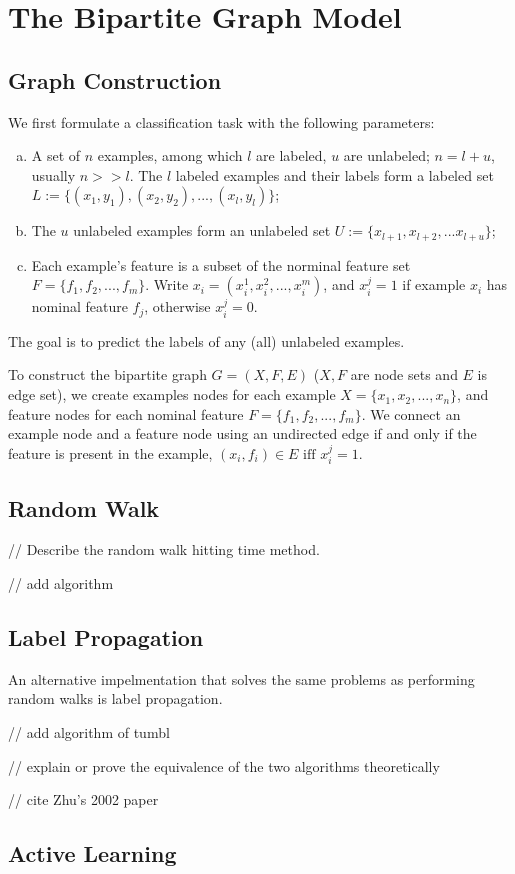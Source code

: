\section{The Bipartite Graph Model}
\subsection{Graph Construction}

We first formulate a classification task with the following parameters:

\begin{enumerate}[a.]

    \item A set of $n$ examples, among which $l$ are labeled, $u$ are unlabeled;
        $n = l + u$, usually $n >> l$.
        The $l$ labeled examples and their labels form a labeled set 
        $L:= \{(x_1, y_1), (x_2, y_2), ..., (x_l, y_l)\}$;

    \item The $u$ unlabeled examples form an unlabeled set 
        $U:= \{x_{l+1}, x_{l+2}, ... x_{l+u}\}$; 

    \item Each example's feature is a subset of the norminal feature set 
        $F = \{f_1, f_2, ..., f_m\}$. 
        Write $x_i = (x_i^1, x_i^2, ..., x_i^m)$, and $x_i^j =
        1$ if example $x_i$ has nominal feature $f_j$, otherwise $x_i^j = 0$. 

\end{enumerate}
The goal is to predict the labels of any (all) unlabeled examples.

To construct the bipartite graph $G = (X, F, E)$ ($X, F$ are node sets and $E$
is edge set), we create examples nodes for each
example $X=\{x_1, x_2, ..., x_n\}$, and feature nodes for each nominal feature
$F=\{f_1, f_2, ..., f_m\}$.
We connect an example node and a feature node using an undirected
edge if and only if the feature is present in the example, $(x_i, f_i) \in E
\mbox{ iff } x_i^j = 1$.  


\subsection{Random Walk}

// Describe the random walk hitting time method.

// add algorithm


\subsection{Label Propagation}


An alternative impelmentation that solves the same problems as performing random
walks is label propagation.


// add algorithm of tumbl

// explain or prove the equivalence of the two algorithms theoretically

// cite Zhu's 2002 paper

\subsection{Active Learning}

